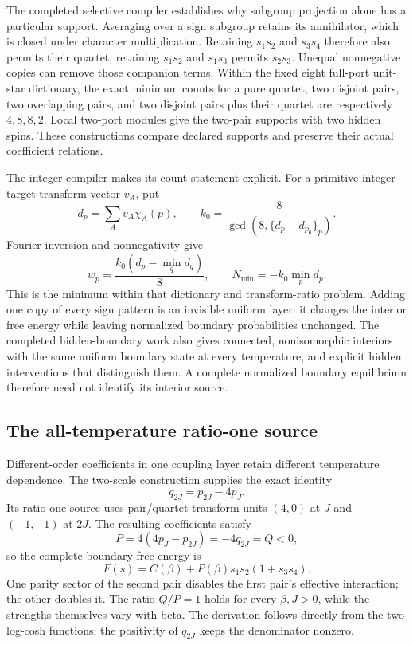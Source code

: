 The completed selective compiler establishes why subgroup projection
alone has a particular support. Averaging over a sign subgroup retains
its annihilator, which is closed under character multiplication.
Retaining \(s_1s_2\) and \(s_3s_4\) therefore also permits their quartet;
retaining \(s_1s_2\) and \(s_1s_3\) permits \(s_2s_3\).
Unequal nonnegative copies can remove those companion terms. Within
the fixed eight full-port unit-star dictionary, the exact minimum counts
for a pure quartet, two disjoint pairs, two overlapping pairs, and two
disjoint pairs plus their quartet are respectively \(4,8,8,2\).
Local two-port modules give the two-pair supports with two hidden spins.
These constructions compare declared supports and preserve their actual
coefficient relations.

The integer compiler makes its count statement explicit. For a primitive
integer target transform vector \(v_A\), put
\[
 d_p=\sum_Av_A\chi_A(p),\qquad
 k_0=\frac8{\gcd(8,\{d_p-d_{p_0}\}_p)}.
\]
Fourier inversion and nonnegativity give
\[
 w_p=\frac{k_0(d_p-\min_qd_q)}8,\qquad
 N_{\min}=-k_0\min_pd_p.
\]
This is the minimum within that dictionary and transform-ratio problem.
Adding one copy of every sign pattern is an invisible uniform layer:
it changes the interior free energy while leaving normalized boundary
probabilities unchanged. The completed hidden-boundary work also gives
connected, nonisomorphic interiors with the same uniform boundary state
at every temperature, and explicit hidden interventions that distinguish
them. A complete normalized boundary equilibrium therefore need not
identify its interior source.

\subsection{The all-temperature ratio-one source}

Different-order coefficients in one coupling layer retain different
temperature dependence. The two-scale construction supplies the exact
identity
\[
 q_{2J}=p_{2J}-4p_J.
\]
Its ratio-one source uses pair/quartet transform units \((4,0)\) at \(J\)
and \((-1,-1)\) at \(2J\). The resulting coefficients satisfy
\[
 P=4(4p_J-p_{2J})=-4q_{2J}=Q<0,
\]
so the complete boundary free energy is
\[
 F(s)=C(\beta)+P(\beta)s_1s_2(1+s_3s_4).
\]
One parity sector of the second pair disables the first pair's effective
interaction; the other doubles it. The ratio \(Q/P=1\) holds for every
\(\beta,J>0\), while the strengths themselves vary with beta.
The derivation follows directly from the two log-cosh functions; the
positivity of \(q_{2J}\) keeps the denominator nonzero.

